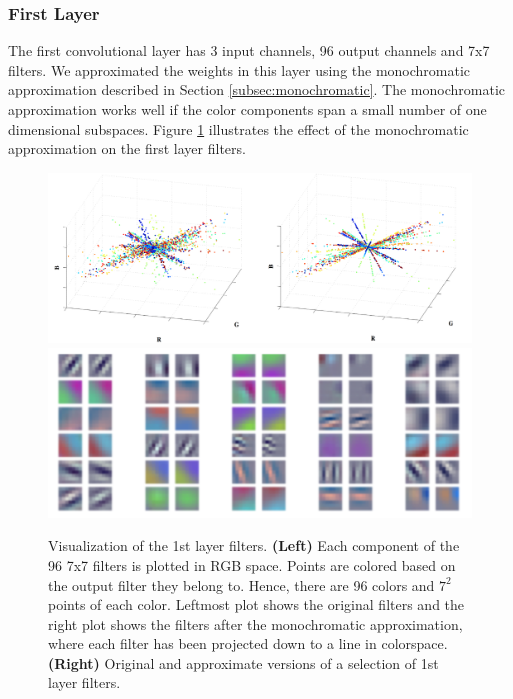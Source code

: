 \subsubsection{First Layer}

The first convolutional layer has 3 input channels, 96
output channels and 7x7 filters.  We approximated the weights in this
layer using the monochromatic approximation described in Section
\ref{subsec:monochromatic}. The monochromatic approximation works well if
the color components span a small number of one dimensional
subspaces. Figure \ref{fig:RGB_components} illustrates the effect of the monochromatic approximation on the first layer filters. 

\begin{figure}[t]
\centering
\begin{minipage}{\textwidth}
	\includegraphics[width=0.55\linewidth]{img/RGB_components_stacked.pdf}
	\includegraphics[width=0.45\linewidth]{img/denoised_stacked.pdf} 
\end{minipage}
\vspace{-3mm}
\label{fig:RGB_components}
\caption{Visualization of the 1st layer filters. {\bf (Left)} Each component of the 96 7x7 filters is plotted in RGB space. Points are colored based on the output filter they belong to. Hence, there are 96 colors and $7^2$ points of each color. Leftmost plot shows the 
  original filters and the right plot shows the filters after the monochromatic approximation, where each filter has been projected down to a line in colorspace. {\bf (Right)} Original and approximate versions of a selection of 1st layer filters.}
\vspace{-3mm}
\end{figure}

